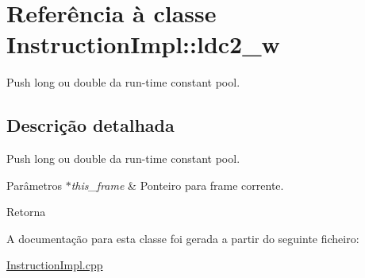 \hypertarget{class_instruction_impl_1_1ldc2__w}{}\section{Referência à classe Instruction\+Impl\+:\+:ldc2\+\_\+w}
\label{class_instruction_impl_1_1ldc2__w}


Push long ou double da run-\/time constant pool.  




\subsection{Descrição detalhada}
Push long ou double da run-\/time constant pool. 


\begin{DoxyParams}{Parâmetros}
{\em $\ast$this\+\_\+frame} & Ponteiro para frame corrente. \\
\hline
\end{DoxyParams}
\begin{DoxyReturn}{Retorna}

\end{DoxyReturn}


A documentação para esta classe foi gerada a partir do seguinte ficheiro\+:\begin{DoxyCompactItemize}
\item 
\hyperlink{_instruction_impl_8cpp}{Instruction\+Impl.\+cpp}\end{DoxyCompactItemize}
